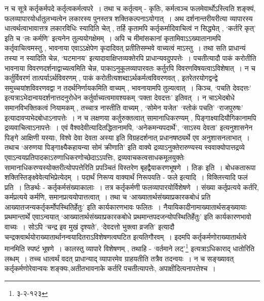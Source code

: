 न च सूत्रे कर्तृकर्मपदे कर्तृत्वकर्मत्वपरे~।
तथा च कर्तृत्वम् - कृतिः, कर्मत्वञ्च फलमेवार्थोऽस्त्विति शङ्क्यं, फलव्यापारयोर्धातुलभ्यत्वेन लकारस्य पुनस्तत्र शक्तिकल्पनाऽयोगात्~।
अथ दर्शनान्तरीयरीत्या व्यापारस्य धात्वर्थत्वाभावात्तत्र लकारविधिः स्यादिति चेत् , तर्हि कृतामपि कर्तृकर्मादिवाचित्वं न सिद्ध्येत् , `कर्तरि कृत्' इति च `लः कर्मणि' इत्यनेन तुल्ययोगक्षेमम्~।
अपि च मीमांसकानां कृतामिवाऽऽख्यातानामपि कर्तृवाचित्वमस्तु , भावनाया एवाऽऽक्षेपेण कृदादिवत् प्रतीतिसम्भवे वाच्यत्वं माऽस्तु~।
 तथा सति प्राधान्यं तस्या न स्यादिति चेन्न, `घटमानय' इत्यादावाक्षिप्तव्यक्तेरपि प्राधान्यवदुपपत्तेः~।
पचतीत्यादौ पाकं करोतीति भावनाया विवरणदर्शनाद्वाच्यत्वमिति चेन्न, पाकाऽनुकूलव्यापारवतः कर्तुरपि विवरणविषयत्वाऽविशेषात्~।
न च कर्तुर्विवरणं तात्पर्याऽर्थविवरणम् , पाकं करोतीत्यशब्दाऽर्थकर्मत्वविवरणवत् , इतरेतरयोगद्वन्द्वे समुच्चयांशविवरणवद्वा न तदर्थनिर्णायकमिति वाच्यम् , भावनायामपि तुल्यत्वात्~।
किञ्च, `पचति देवदत्तः' इत्यत्राऽभेदान्वयदर्शनात्तदनुरोधेन कर्तुर्वाच्यत्वमावश्यकम् `पक्ता देवदत्तः' इतिवत्~।
न चाऽभेदबोधे समानविभक्तिकत्वं नियामकम् , तच्चात्र नास्तीति वाच्यम् , `सोमेन यजेत' `स्तोकं पचति' `राजपुरुषः' इत्यादावप्यभेदबोधाऽनापत्तेः~।
न च लक्षणया कर्तुरुक्तत्वात् सामानाधिकरण्यम् , पिङ्गाक्ष्यादियौगिकानामपि द्रव्यवाचित्वाऽनापत्तेः~।
एवं वैश्वदेवीत्यादितद्धितानामपि, `अनेकमन्यपदार्थे', `साऽस्य देवता' इत्यनुशासनेन पिङ्गे आक्षिणी यस्याः, विश्वे देवा देवता अस्या इति विग्रहदर्शनात् प्रधानषष्ठ्यर्थे एव अनुशासनलाभात्~।
तथाच `अरुणया पिङ्गाक्ष्यैकहायन्या सोमं क्रीणाति' इति वाक्ये द्रव्याऽनुक्तेरारुण्यस्य स्ववाक्योपात्तद्रव्ये एवाऽन्वयप्रतिपादकाऽरुणाधिकरणोच्छेदाऽऽपत्तिः, द्रव्यवाचकत्वसाधकमूलयुक्तेः सामानाधिकरण्यस्योक्तरीत्योपपत्तेरिति प्रपञ्चितं विस्तरेण बृहद्वैयाकरणभूषणे~।
तिङः इति~।
बोधकतारूपा शक्तिस्तिङ्क्ष्वेवेत्यभिप्रेत्येदम्~।
पदार्थं निरूप्य वाक्यार्थं निरूपयति - फले इत्यादि~।
विक्लित्त्यादि फलं प्रति~।
तिङर्थः - कर्तृकर्मसंख्याकालाः~।
तत्र कर्तृकर्मणी फलव्यापारयोर्विशेषणे~।
संख्या कर्तृप्रत्यये कर्तरि, कर्मप्रत्यये कर्मणि, समानप्रत्ययोपात्तत्वात्~।
तथा च `आख्यातार्थसंख्याप्रकारकबोधं प्रति आख्यातजन्यकर्तृकर्मोपस्थितिर्हेतुः' इति कार्यकारणभावः फलितः~।
नैयायिकादीनामाख्यातार्थसङ्ख्यायाः प्रथमान्तार्थे एवाऽन्वयात् `आख्यातार्थसंख्याप्रकारकबोधे प्रथमान्तपदजन्योपस्थितिर्हेतुः' इति कार्यकारणभावो वाच्यः~।
सोऽपि `चन्द्र इव मुखं दृश्यते', `देवदत्तो भुक्त्वा व्रजति' इत्यादौ चन्द्रक्त्वार्थयोराख्यातार्थानन्वयादितराऽविशेषणत्वघटित इत्यतिगौरवम्~।
इदमपि कर्तृकर्मणोराख्यातार्थत्वे मानमिति स्पष्टं भूषणे~।
कालस्तु व्यापारे विशेषणम् , तथाहि - `वर्तमाने लट्'\footnote{३-२-१२३} इत्यत्राऽधिकाराद् धातोरिति लब्धम्~।
तच्च धात्वर्थं वदत् प्राधान्याद् व्यापारमेव ग्राहयतीति तत्रैव तदन्वयः~।
न च सङ्ख्यावत् कर्तृकर्मणोरेवान्वयः शङ्क्यः,अतीतभावनाके कर्तरि पचतीत्यापत्तेः, अपाक्षीदित्यनापत्तेश्च~।
